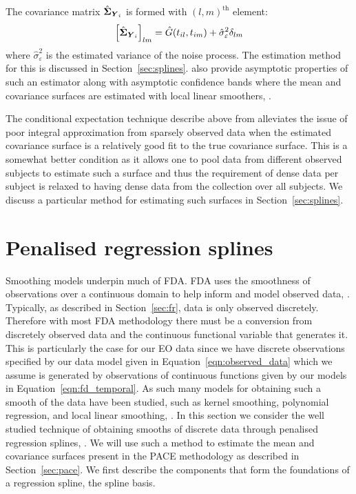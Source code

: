 The covariance matrix $\hat{\bm{{\Sigma}}}_{\bm{{Y}}_{i}}$ is formed with $\left(l, m\right)^\text{th}$ element:
\begin{equation}\label{eqn:sig_cov}
	\left[\hat{\bm{{\Sigma}}}_{\bm{{Y}}_{i}}\right]_{lm} = \hat{G}(t_{il}, t_{im}) + \hat{\sigma}_\varepsilon^2 \delta_{lm}
\end{equation}
where $\hat{\sigma}_\varepsilon^2$ is the estimated variance of the noise process.
The estimation method for this is discussed in Section~\ref{sec:splines}.
\citeauthor{yao_functional_2005} also provide asymptotic properties of such an estimator  along with asymptotic confidence bands where the mean and covariance surfaces are estimated with local linear smoothers, \citep{fan_study_1996}.

The conditional expectation technique describe above from \citep{yao_functional_2005} alleviates the issue of poor integral approximation from sparsely observed data when the estimated covariance surface is a relatively good fit to the true covariance surface.
This is a somewhat better condition as it allows one to pool data from different observed subjects to estimate such a surface and thus the requirement of dense data per subject is relaxed to having dense data from the collection over all subjects.
We discuss a particular method for estimating such surfaces in Section~\ref{sec:splines}.

\section{Penalised regression splines \label{sec:splines}}
 Smoothing models underpin much of FDA.
 FDA uses the smoothness of observations over a continuous domain to help inform and model observed data, \citep{ramsay_functional_2010}.
 Typically, as described in Section~\ref{sec:fr}, data is only observed discretely.
 Therefore with most FDA methodology there must be a conversion from discretely observed data and the continuous functional variable that generates it.
 This is particularly the case for our EO data since we have discrete observations specified by our data model given in Equation~\eqref{eqn:observed_data} which we assume is generated by observations of continuous functions given by our models in Equation~\eqref{eqn:fd_temporal}.
 As such many models for obtaining such a smooth of the data have been studied, such as kernel smoothing, polynomial regression, and local linear smoothing, \citep[Chapter~4]{ramsay_functional_2010}. 
 In this section we consider the well studied technique of obtaining smooths of discrete data through penalised regression splines, \citep{ruppert_semiparametric_2003}.
 We will use such a method to estimate the mean and covariance surfaces present in the PACE methodology as described in Section~\ref{sec:pace}. 
 We first describe the components that form the foundations of a regression spline, the spline basis.
 

